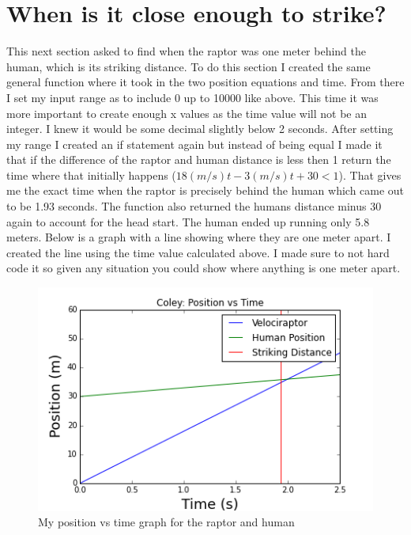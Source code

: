 \documentclass[twocolumn]{revtex4}
\begin{document}
\section{When is it close enough to strike?}
	This next section asked to find when the raptor was one meter behind the human, which is its striking distance. To do this section I created the same general function where it took in the two position equations and time. From there I set my input range as to include 0 up to 10000 like above. This time it was more important to create enough x values as the time value will not be an integer. I knew it would be some decimal slightly below 2 seconds. After setting my range I created an if statement again but instead of being equal I made it that if the difference of the raptor and human distance is less then 1 return the time where that initially happens ($ 18(m/s)t - 3(m/s)t + 30 < 1 $). That gives me the exact time when the raptor is precisely behind the human which came out to be 1.93 seconds. The function also returned the humans distance minus 30 again to account for the head start. The human ended up running only 5.8 meters. Below is a graph with a line showing where they are one meter apart. I created the line using the time value calculated above. I made sure to not hard code it so given any situation you could show where anything is one meter apart. 
	\begin{figure}[h]
	\centering
	\includegraphics[scale=.5]{Position_vs_Time_Striking.png}
	\caption{My position vs time graph for the raptor and human}
	\end{figure}
	
\end{document}
